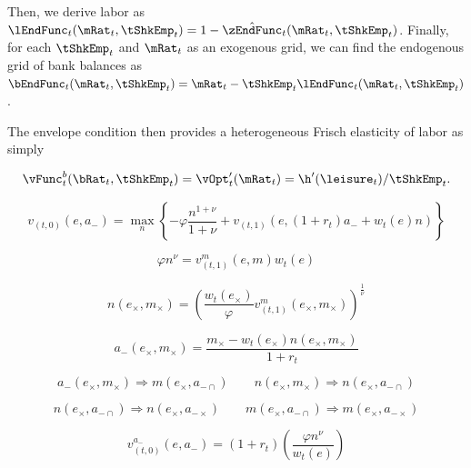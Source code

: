 \documentclass{article}
\begin{document}
Then, we derive labor as $\lEndFunc_{t}(\mRat_{t}, \tShkEmp_{t}) = 1 - \hat{\zEndFunc}_{t}(\mRat_{t}, \tShkEmp_{t})$. Finally, for each $\tShkEmp_{t}$ and $\mRat_{t}$ as an exogenous grid, we can find the endogenous grid of bank balances as $\bEndFunc_{t}(\mRat_{t}, \tShkEmp_{t}) = \mRat_{t} - \tShkEmp_{t}\lEndFunc_{t}(\mRat_{t}, \tShkEmp_{t})$.

The envelope condition then provides a heterogeneous Frisch elasticity of labor as simply

\begin{equation}
\vFunc_{t}^{b}(\bRat_{t}, \tShkEmp_{t}) = \vOpt_{t}'(\mRat_{t}) =
    \h'(\leisure_{t})/\tShkEmp_{t}.
\end{equation}

\begin{equation}
v_{(t,0)}(e, a_{-}) = \max_{n} \left\{ - \varphi \frac{n^{1+\nu}}{1+\nu} + v_{(t,1)}(e,(1 + r_t)a_{-} + w_t(e) n ) \right\}
\end{equation}

\begin{equation}
\varphi n^{\nu} = v_{(t,1)}^m(e,m) w_t(e) \tag{euler}
\end{equation}

\begin{equation}
n(e_\times,m_\times) = \left(\frac{ w_t(e_\times)}{\varphi}v_{(t,1)}^m(e_\times,m_\times)\right)^{\frac{1}{\nu}} \tag{egm}
\end{equation}

\begin{equation}
a_{-}(e_\times, m_\times) = \frac{m_\times - w_t(e_\times) n(e_\times,m_\times) }{1+r_t} \tag{budget}
\end{equation}

\begin{equation}
a_{-}(e_\times,m_\times) \Rightarrow m(e_\times, a_{-\cap}) \qquad n(e_\times,m_\times) \Rightarrow n(e_\times, a_{-\cap}) \tag{swap dims}
\end{equation}

\begin{equation}
n(e_\times, a_{-\cap}) \Rightarrow n(e_\times, a_{-\times}) \qquad m(e_\times, a_{-\cap}) \Rightarrow m(e_\times, a_{-\times}) \tag{regrid}
\end{equation}

\begin{equation}
v_{(t,0)}^{a_{-}}(e,a_{-}) = (1 + r_t) \left(\frac{\varphi n^{\nu}}{w_t(e)}\right) \tag{ec}
\end{equation}
\end{document}
